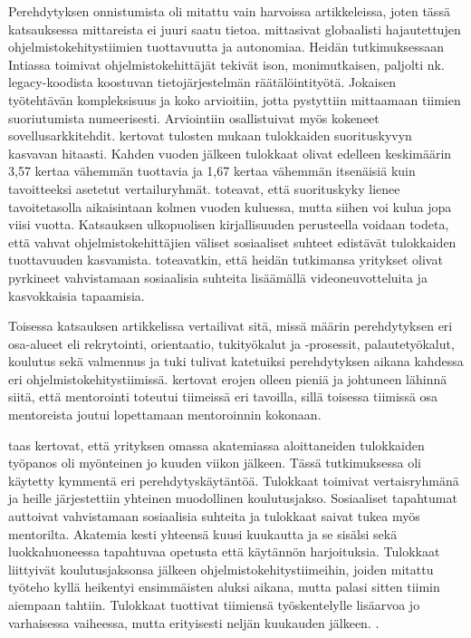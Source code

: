 \documentclass[utf8]{gradu3}
\begin{document}
Perehdytyksen onnistumista oli mitattu vain harvoissa artikkeleissa, joten tässä katsauksessa mittareista ei juuri saatu tietoa. \textcite{britto-ym-2020} mittasivat globaalisti hajautettujen ohjelmistokehitystiimien tuottavuutta ja autonomiaa. Heidän tutkimuksessaan Intiassa toimivat ohjelmistokehittäjät tekivät ison, monimutkaisen, paljolti nk. legacy-koodista koostuvan tietojärjestelmän räätälöintityötä. Jokaisen työtehtävän kompleksisuus ja koko arvioitiin, jotta pystyttiin mittaamaan tiimien suoriutumista numeerisesti. Arviointiin osallistuivat myös kokeneet sovellusarkkitehdit. \textcite{britto-ym-2020} kertovat tulosten mukaan tulokkaiden suorituskyvyn kasvavan hitaasti. Kahden vuoden jälkeen tulokkaat olivat edelleen keskimäärin 3,57 kertaa vähemmän tuottavia ja 1,67 kertaa vähemmän itsenäisiä kuin tavoitteeksi asetetut vertailuryhmät. \textcite{britto-ym-2020} toteavat, että suorituskyky lienee tavoitetasolla aikaisintaan kolmen vuoden kuluessa, mutta siihen voi kulua jopa viisi vuotta. Katsauksen ulkopuolisen kirjallisuuden perusteella \parencite{casalnuovo-ym-2015} voidaan todeta, että vahvat ohjelmistokehittäjien väliset sosiaaliset suhteet edistävät tulokkaiden tuottavuuden kasvamista. \textcite{britto-ym-2020} toteavatkin, että heidän tutkimansa yritykset olivat pyrkineet vahvistamaan sosiaalisia suhteita lisäämällä videoneuvotteluita ja kasvokkaisia tapaamisia. 

Toisessa katsauksen artikkelissa \textcite{moe-ym-2020} vertailivat sitä, missä määrin perehdytyksen eri osa-alueet \parencite{bauer-2010} eli rekrytointi, orientaatio, tukityökalut ja -prosessit, palautetyökalut, koulutus sekä valmennus ja tuki tulivat katetuiksi perehdytyksen aikana kahdessa eri ohjelmistokehitystiimissä. \textcite{moe-ym-2020} kertovat erojen olleen pieniä ja johtuneen lähinnä siitä, että mentorointi toteutui tiimeissä eri tavoilla, sillä toisessa tiimissä osa mentoreista joutui lopettamaan mentoroinnin kokonaan.

\textcite{shannon-pool-2016} taas kertovat, että yrityksen omassa akatemiassa aloittaneiden tulokkaiden työpanos oli myönteinen jo kuuden viikon jälkeen. Tässä tutkimuksessa oli käytetty kymmentä eri perehdytyskäytäntöä. Tulokkaat toimivat vertaisryhmänä ja heille järjestettiin yhteinen muodollinen koulutusjakso. Sosiaaliset tapahtumat auttoivat vahvistamaan sosiaalisia suhteita ja tulokkaat saivat tukea myös mentorilta. Akatemia kesti yhteensä kuusi kuukautta ja se sisälsi sekä luokkahuoneessa tapahtuvaa opetusta että käytännön harjoituksia. Tulokkaat liittyivät koulutusjaksonsa jälkeen ohjelmistokehitystiimeihin, joiden mitattu työteho kyllä heikentyi ensimmäisten aluksi aikana, mutta palasi sitten tiimin aiempaan tahtiin. Tulokkaat tuottivat tiimiensä työskentelylle lisäarvoa jo varhaisessa vaiheessa, mutta erityisesti neljän kuukauden jälkeen. \parencite{shannon-pool-2016}.
\end{document}
